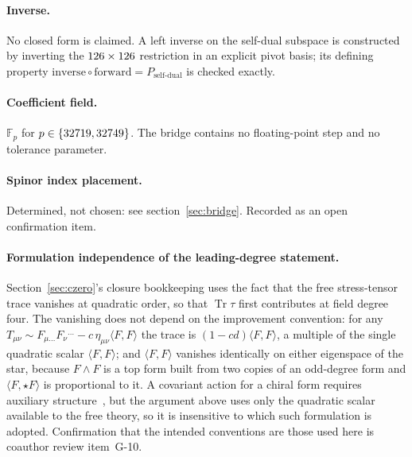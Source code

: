\paragraph{Inverse.} No closed form is claimed. A left inverse on the self-dual
subspace is constructed by inverting the $126\times126$
restriction in an explicit pivot basis; its defining property
$\mathrm{inverse}\circ\mathrm{forward}=P_{\text{self-dual}}$ is checked exactly.

\paragraph{Coefficient field.} $\mathbb{F}_p$ for $p\in\{32719, 32749\}$. The
bridge contains no floating-point step and no tolerance parameter.

\paragraph{Spinor index placement.} Determined, not chosen: see
section~\ref{sec:bridge}. Recorded as an open confirmation item.


\paragraph{Formulation independence of the leading-degree statement.}
Section~\ref{sec:czero}'s closure bookkeeping uses the fact that the free
stress-tensor trace vanishes at quadratic order, so that $\operatorname{Tr}\tau$
first contributes at field degree four. The vanishing does not depend on the
improvement convention: for any
$T_{\mu\nu} \sim F_{\mu\ldots}F_\nu{}^{\ldots} - c\,\eta_{\mu\nu}\langle F,F\rangle$
the trace is $(1-cd)\langle F,F\rangle$, a multiple of the single quadratic
scalar $\langle F,F\rangle$; and $\langle F,F\rangle$ vanishes identically on
either eigenspace of the star, because $F\wedge F$ is a top form built from two
copies of an odd-degree form and $\langle F,\star F\rangle$ is proportional to
it. A covariant action for a chiral form requires auxiliary
structure~\cite{Pasti:1995tn,Pasti:1997gx}, but the argument above uses only
the quadratic scalar available to the free theory, so it is insensitive to which
such formulation is adopted. Confirmation that the intended conventions are
those used here is coauthor review item~G-10.
